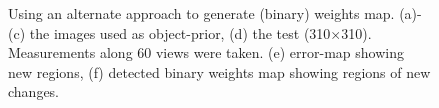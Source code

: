 \documentclass{article}
\begin{document}
\begin{figure}[]
\begin{subfigure}[b]{0.32\linewidth}
        \caption{}
    \end{subfigure}
     \caption[Selecting $k$]{Using an alternate approach to generate (binary) weights map. (a)-(c) the images used as object-prior, (d) the test (310$\times$310). Measurements along $60$ views were taken. (e) error-map showing new regions, (f) detected binary weights map showing regions of new changes.}%
\label{fig:okra_svm}
\end{figure}
\end{document}
